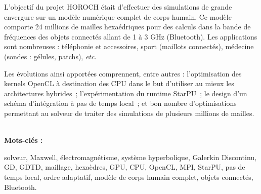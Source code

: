\documentclass[a4paper,12pt]{report}
\begin{document}
\begin{titlepage}
{L'objectif du projet HOROCH était d'effectuer des simulations
de grande envergure sur un modèle numérique complet de corps humain.
Ce modèle comporte 24 millions de mailles
hexaédriques pour des calculs dans la bande de fréquences
des objets connectés allant de 1 à 3 GHz (Bluetooth).
Les applications sont nombreuses : téléphonie et accessoires,
sport (maillots connectés), médecine (sondes : gélules, patchs),
\textit{etc}.

Les évolutions ainsi apportées comprennent, entre autres :
l'optimisation des kernels OpenCL à destination des CPU
dans le but d'utiliser au mieux les architectures hybrides~;
l'expérimentation du runtime StarPU~; le design d'un
schéma d'intégration à pas de temps local~;
et bon nombre d'optimisations permettant au solveur
de traiter des simulations de plusieurs millions de mailles.

~\\
\textbf{Mots-clés :}\\
\raggedright
solveur, Maxwell, électromagnétisme, système hyperbolique,
Galerkin Discontinu, GD, GDTD, maillage, hexaèdres,
GPU, CPU, OpenCL, MPI, StarPU,
pas de temps local, ordre adaptatif, modèle de corps humain complet,
objets connectés, Bluetooth.
  }
\end{titlepage}
\end{document}
